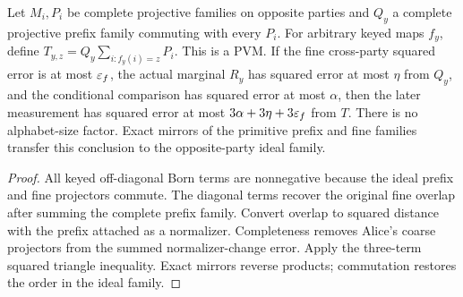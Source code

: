 \begin{lemma}
\label{lem:intro-conditional-normalizer}
\leanok
Let $M_i,P_i$ be complete projective families on opposite parties and
$Q_y$ a complete projective prefix family commuting with every $P_i$.
For arbitrary keyed maps $f_y$, define
$T_{y,z}=Q_y\sum_{i:f_y(i)=z}P_i$.
This is a PVM. If the fine cross-party squared error is at most $\varepsilon_f$,
the actual marginal $R_y$ has squared error at most $\eta$ from $Q_y$,
and the conditional comparison has squared error at most $\alpha$, then
the later measurement has squared error at most
$3\alpha+3\eta+3\varepsilon_f$ from $T$. There is no alphabet-size factor.
Exact mirrors of the primitive prefix and fine families transfer this
conclusion to the opposite-party ideal family.
\end{lemma}
\begin{proof}
\leanok
All keyed off-diagonal Born terms are nonnegative because the ideal prefix
and fine projectors commute. The diagonal terms recover the original fine
overlap after summing the complete prefix family. Convert overlap to squared
distance with the prefix attached as a normalizer. Completeness removes
Alice's coarse projectors from the summed normalizer-change error. Apply
the three-term squared triangle inequality. Exact mirrors reverse products;
commutation restores the order in the ideal family.
\end{proof}


